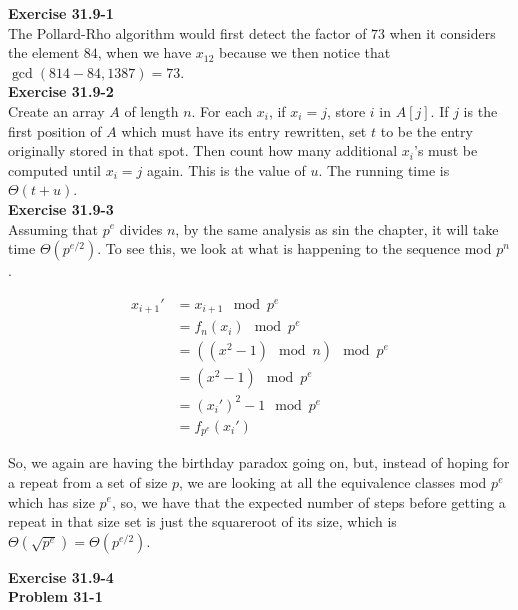 \documentclass{article}
\begin{document}
\noindent\textbf{Exercise 31.9-1}\\

The Pollard-Rho algorithm would first detect the factor of $73$ when it considers the element $84$, when we have $x_{12}$ because we then notice that $\gcd(814-84,1387) = 73$.\\

\noindent\textbf{Exercise 31.9-2}\\ 

Create an array $A$ of length $n$.  For each $x_i$, if $x_i = j$, store $i$ in $A[j]$.  If $j$ is the first position of $A$ which must have its entry rewritten, set $t$ to be the entry originally stored in that spot.  Then count how many additional $x_i$'s must be computed until $x_i = j$ again. This is the value of $u$.  The running time is $\Theta(t+u)$. \\

\noindent\textbf{Exercise 31.9-3}\\

Assuming that $p^e$ divides $n$, by the same analysis as sin the chapter, it will take time $\Theta(p^{e/2})$. To see this, we look at what is happening to the sequence mod $p^n$.

\begin{align*}
x_{i+1}' &= x_{i+1} \mod p^e\\
& = f_n(x_i) \mod p^e\\
&=((x^2-1)\mod n)\mod p^e\\
&=(x^2-1)\mod p^e\\
&= (x_i')^2-1 \mod p^e\\
&=f_{p^e}(x_i')
\end{align*}

So, we again are having the birthday paradox going on, but, instead of hoping for a repeat from a set of size $p$, we are looking at all the equivalence classes mod $p^e$ which has size $p^e$, so, we have that the expected number of steps before getting a repeat in that size set is just the squareroot of its size, which is $\Theta(\sqrt{p^{e}}) =\Theta(p^{e/2})$. 

\noindent\textbf{Exercise 31.9-4}\\


\noindent\textbf{Problem 31-1}\\
\end{document}
